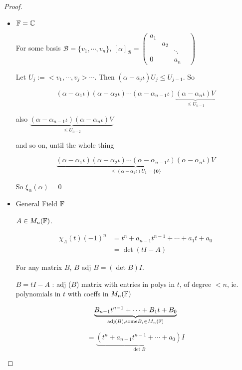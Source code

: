 \documentclass[a4paper]{article}
\begin{document}
\begin{proof}
	\begin{itemize}
		\item $ \mathbb{F} = \mathbb{C} $
		
		For some basis $ \mathcal{B} = \{ v_{1},\cdots,v_{n} \} $, $ [\alpha]_{\mathcal{B}} = \begin{pmatrix}
		a_{1} & & & \\
		& a_{2} & & \\
		& & \ddots & \\
		0 & & a_{n}
		\end{pmatrix} $
		
		
		
		Let $ U_{j} := < v_{1},\cdots,v_{j} > \cdots $. Then $ (\alpha - a_{j} \iota ) U_{j} \leq U_{j-1} $. So
		
		\[ (\alpha - \alpha_{1} \iota)(\alpha - \alpha_{2} \iota)  \cdots  (\alpha - \alpha_{n-1} \iota)\underbrace{(\alpha - \alpha_{n} \iota) V}_{\leq U_{n-1}} \]
		
		also $ \underbrace{(\alpha - \alpha_{n-1} \iota) (\alpha - \alpha_{n} \iota) V}_{\leq U_{n-2}} $
		
		and so on, until the whole thing 
		
		\[ \underbrace{(\alpha - \alpha_{1} \iota)(\alpha - \alpha_{2} \iota)  \cdots  (\alpha - \alpha_{n-1} \iota)(\alpha - \alpha_{n} \iota) V}_{\leq  (\alpha - \alpha_{1} \iota)U_{1} = 
			\{ \mathbf{0} \}  }  \]
		
		So $ \xi_{\alpha}(\alpha) = 0 $
		
		\item General Field $ \mathbb{F} $
		
		$ A \in M_{n}(\mathbb{F}) $. 
		
		\begin{align*}
		\chi_{A}(t) (-1)^{n} & =  t^{n} + a_{n-1} t^{n-1} + \cdots + a_{1} t + a_{0} \\
		& = \det (t I - A)
		\end{align*}
		
		For any matrix $ B $, $ B \text{ adj } B = (\det B) I $.
		
		$ B = t I - A $ : adj ($ B $) matrix with entries in polys in $ t $, of degree $  < n $, ie. polynomials in $ t $ with coeffs in $ M_{n}(\mathbb{F}) $
		
		
		\[ \underbrace{B_{n-1}   t^{n-1}  + \cdots + B_{1} t + B_{0}  }_{\text{adj}(B), \text{some} B_{i} \in M_{n}(\mathbb{F}) } \]
		
		\[ = \underbrace{( t^{n}   + a_{n-1}  t^{n-1}  + \cdots + a_{0}   )}_{\det B} I \]
		

\end{itemize}
\end{proof}
\end{document}
